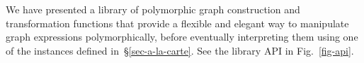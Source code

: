 We have presented a library of polymorphic graph construction and
transformation functions that
provide a flexible and elegant way to manipulate graph expressions
polymorphically, before eventually interpreting them using one of the 
instances defined in~\S\ref{sec-a-la-carte}. See the library API in
Fig.~\ref{fig-api}.





